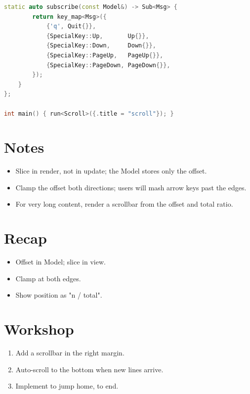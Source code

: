 \begin{lstlisting}[language=C++]
    static auto subscribe(const Model&) -> Sub<Msg> {
        return key_map<Msg>({
            {'q', Quit{}},
            {SpecialKey::Up,       Up{}},
            {SpecialKey::Down,     Down{}},
            {SpecialKey::PageUp,   PageUp{}},
            {SpecialKey::PageDown, PageDown{}},
        });
    }
};

int main() { run<Scroll>({.title = "scroll"}); }
\end{lstlisting}

\section{Notes}

\begin{itemize}[leftmargin=*]
  \item Slice in render, not in update; the Model stores
    only the offset.
  \item Clamp the offset both directions; users will mash
    arrow keys past the edges.
  \item For very long content, render a scrollbar from the
    offset and total ratio.
\end{itemize}

\section{Recap}

\begin{recap}
\begin{itemize}[leftmargin=*]
  \item Offset in Model; slice in view.
  \item Clamp at both edges.
  \item Show position as "n / total".
\end{itemize}
\end{recap}

\section*{Workshop}

\begin{enumerate}[leftmargin=*]
  \item Add a scrollbar in the right margin.
  \item Auto-scroll to the bottom when new lines arrive.
  \item Implement  to jump home,  to end.
\end{enumerate}
